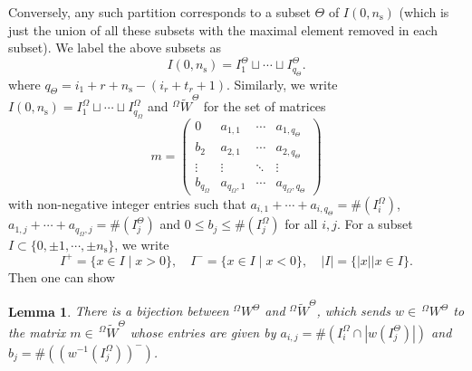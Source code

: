 \documentclass[12pt,oneside,reqno]{amsart}
\theoremstyle{plain}
\newtheorem{lemma}[theorem]{Lemma}
\begin{document}
	Conversely, any such partition corresponds to a subset $\Theta$ of $I(0,n_\mathrm{s})$ (which is just the union of all these subsets with the maximal element removed in each subset). We label the above subsets as
	\[
	I(0,n_\mathrm{s})
	=
	I^\Theta_1
	\sqcup\cdots\sqcup
	I^\Theta_{q_\Theta}.
	\]
	where $q_\Theta=i_1+r+n_\mathrm{s}-(i_r+t_r+1)$. Similarly, we write
	$I(0,n_\mathrm{s})=I^\Omega_1\sqcup\cdots\sqcup	I^\Omega_{q_\Omega}$ and $^\Omega\widetilde{W}^\Theta$ for the set of matrices
	\begin{equation}\label{m}
		m=\begin{pmatrix}
			0 & a_{1,1} & \cdots & a_{1,q_\Theta} \\
			b_2 & a_{2,1} & \cdots & a_{2,q_\Theta} \\
			\vdots & \vdots & \ddots & \vdots \\
			b_{q_\Omega} & a_{q_\Omega,1} & \cdots & a_{q_\Omega,q_\Theta}
		\end{pmatrix}
	\end{equation}
	with non-negative integer entries such that
	$a_{i,1}+\cdots+a_{i,q_\Theta}=\# (I_i^\Omega)$,
	$a_{1,j}+\cdots+a_{q_\Omega,j}=\# (I_j^\Theta)$
	and
	$0\le b_j\le \# (I_j^\Omega)$
	for all $i,j$.
	For a subset
	$I\subset\{0,\pm1,\cdots,\pm n_\mathrm{s}\}$,
	we write
	\[
	I^+=\{x\in I\mid x>0\},
	\quad
	I^-=\{x\in I\mid x<0\},
	\quad
	|I|=
	\{|x|
	\big|
	x\in I\}.
	\]
	Then one can show
	\begin{lemma}
		There is a bijection between $^\Omega W^\Theta$ and	$^\Omega\widetilde{W}^\Theta$, which sends $w\in\,^\Omega W^\Theta$
		to the matrix $m\in\,^\Omega\widetilde{W}^\Theta$ whose entries are given by $a_{i,j}=\# (I_i^\Omega\cap|w(I_j^\Theta)|)$	and	$b_j=\# ((w^{-1}(I_j^\Omega))^-)$.
	\end{lemma}
\end{document}
